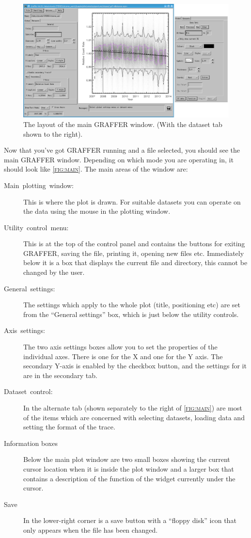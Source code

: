 \documentclass[11pt,twoside,english]{article}
\begin{document}
\begin{figure}[htbp]
  \centering
  \includegraphics[width=\textwidth]{main}
  \caption{The layout of the main GRAFFER window. (With the dataset tab
    shown to the right).}
  \label{fig:main}
\end{figure}
Now that you've got GRAFFER running and a file selected, you should see
the main GRAFFER window. Depending on which mode you are operating in,
it should look like \textsc{\autoref{fig:main}}.  The main areas of the
window are:

\begin{description}
\item [Main~plotting~window:]This is where the plot is drawn. For
  suitable datasets you can operate on the data using the mouse in the
  plotting window.
\item [Utility~control~menu:]This is at the top of the control panel
  and contains the buttons for exiting GRAFFER, saving the file,
  printing it, opening new files etc. Immediately below it is a box
  that displays the current file and directory, this cannot be changed
  by the user.
\item [General~settings:]The settings which apply to the whole plot
  (title, positioning etc) are set from the {}``General settings'' box,
  which is just below the utility controls.
\item [Axis~settings:]The two axis settings boxes allow you to set the
  properties of the individual axes. There is one for the X and one for
  the Y axis. The secondary Y-axis is enabled by the checkbox button,
  and the settings for it are in the secondary tab.
\item [Dataset~control:]In the alternate tab (shown separately to the
  right of \textsc{\autoref{fig:main}}) are most of the items which are
  concerned with selecting datasets, loading data and setting the
  format of the trace.

\item[Information boxes] Below the main plot window are two small boxes
  showing the current cursor location when it is inside the plot window
  and a larger box that contains a description of the function of the
  widget currently under the cursor.

\item[Save] In the lower-right corner is a save button with a ``floppy
  disk'' icon that only appears when the file has been changed.
\end{description}
\end{document}
